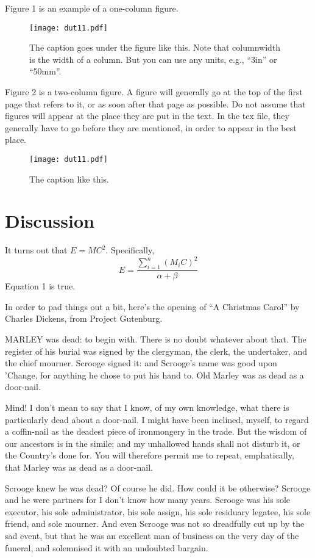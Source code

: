 \documentclass[twocolumn]{article}
\begin{document}
Figure 1 is an example of a one-column figure. 

\begin{figure}[t!]
\texttt{[image: dut11.pdf]}
\caption{The caption goes under the figure like this. Note that
  columnwidth is the width of a column. But you can use any units,
  e.g., ``3in'' or ``50mm''.}
\end{figure}

Figure 2 is a two-column figure. A figure will generally go at the top of
the first page that refers to it, or as soon after that page as
possible. Do not assume that figures will appear at the place they are
put in the text. In the tex file, they generally have to go before
they are mentioned, in order to appear in the best place.

\begin{figure*}[t!]\centering
\texttt{[image: dut11.pdf]}
\caption{The caption like this.}
\end{figure*}

\section{Discussion}

It turns out that $E = MC^2$.  Specifically,
\begin{equation}
E = \frac { \sum_{i=1}^n ( M_i C )^2 }{ \alpha + \beta }
\end{equation}
Equation 1 is true.

In order to pad things out a bit, here's the opening of ``A Christmas Carol'' by Charles Dickens, from Project Gutenburg.

MARLEY was dead: to begin with. There is no doubt
whatever about that. The register of his burial was
signed by the clergyman, the clerk, the undertaker,
and the chief mourner. Scrooge signed it: and
Scrooge's name was good upon 'Change, for anything he
chose to put his hand to. Old Marley was as dead as a
door-nail.

Mind! I don't mean to say that I know, of my
own knowledge, what there is particularly dead about
a door-nail. I might have been inclined, myself, to
regard a coffin-nail as the deadest piece of ironmongery
in the trade. But the wisdom of our ancestors
is in the simile; and my unhallowed hands
shall not disturb it, or the Country's done for. You
will therefore permit me to repeat, emphatically, that
Marley was as dead as a door-nail.

Scrooge knew he was dead? Of course he did.
How could it be otherwise? Scrooge and he were
partners for I don't know how many years. Scrooge
was his sole executor, his sole administrator, his sole
assign, his sole residuary legatee, his sole friend, and
sole mourner. And even Scrooge was not so dreadfully
cut up by the sad event, but that he was an excellent
man of business on the very day of the funeral,
and solemnised it with an undoubted bargain.
\end{document}

